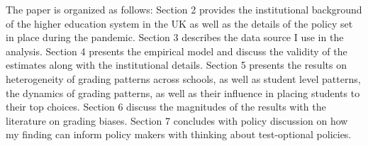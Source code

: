 The paper is organized as follows: Section 2 provides the institutional background of the higher education system in the UK as well as the details of the policy set in place during the pandemic. Section 3 describes the data source I use in the analysis. Section 4 presents the empirical model and discuss the validity of the estimates along with the institutional details. Section 5 presents the results on heterogeneity of grading patterns across schools, as well as student level patterns, the dynamics of grading patterns, as well as their influence in placing students to their top choices. Section 6 discuss the magnitudes of the results with the literature on grading biases. Section 7 concludes with policy discussion on how my finding can inform policy makers with thinking about test-optional policies. 